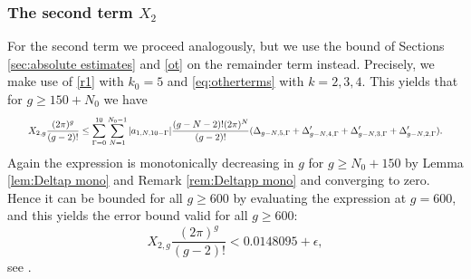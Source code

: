 \documentclass[12pt]{amsart}
\theoremstyle{definition}
\numberwithin{equation}{section}
\newcommand{\numcheck}[1]{\cite[Computation #1]{SupplementaryNotebook}}
\theoremstyle{definition} %
\theoremstyle{remark}
\begin{document}
\subsubsection{The second term $X_2$}
For the second term we proceed analogously, but we use the bound of Sections \ref{sec:absolute estimates} and \ref{ot} on the remainder term instead.
Precisely, we make use of \eqref{r1} with $k_0 = 5$ and \eqref{eq:otherterms} with $k = 2, 3, 4$.
This yields that for $g\geq 150+N_0$ we have 
\[
\resizebox{.95\hsize}{!}{$\displaystyle{
X_{2,g}\frac{(2\pi)^g}{(g-2)!}
\leq 
    \sum_{\Gamma=0}^{10}
    \sum_{N=1}^{N_0-1}
    |a_{1,N,10-\Gamma}| 
    \frac{(g-N-2)! (2\pi)^N}{(g-2)!}
    (\Delta_{g-N,5,\Gamma} 
    + \Delta_{g-N,4,\Gamma}'
    + \Delta_{g-N,3,\Gamma}'
    + \Delta_{g-N,2,\Gamma}').
}$}\]
Again the expression is monotonically decreasing in $g$ for $g\geq N_0+150$ by Lemma \ref{lem:Deltap mono} and Remark \ref{rem:Deltapp mono} and converging to zero. 
Hence it can be bounded for all $g\geq 600$ by evaluating the expression at $g=600$, and this yields the error bound valid for all $g\geq 600$:
\[
    X_{2,g}\frac{(2\pi)^g}{(g-2)!} < 0.0148095+\epsilon,
\]
see \numcheck{XEVAL}.
\end{document}

